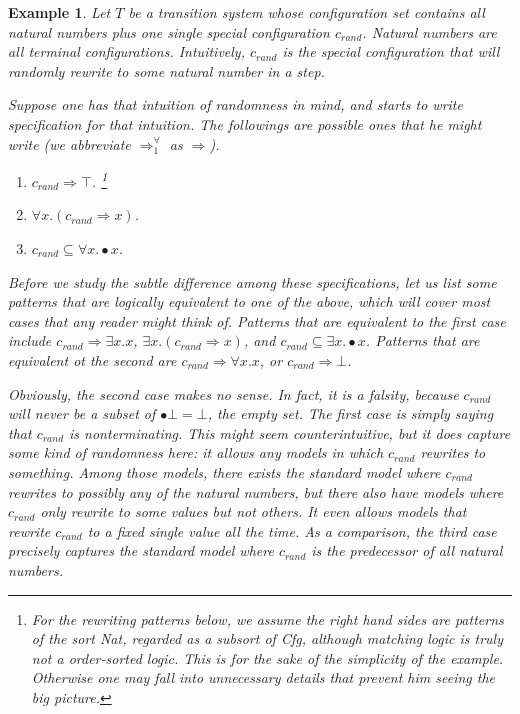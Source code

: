 \documentclass{article}
\theoremstyle{plain}
\newtheorem{eg}[thm]{Example}
\def\snext{\bullet}
\def\Cfg{\textit{Cfg}}
\begin{document}
\begin{eg}
	Let $T$ be a transition system whose configuration set contains all natural numbers plus one single special configuration $c_\textit{rand}$. Natural numbers are all terminal configurations. Intuitively, $c_\textit{rand}$ is the special configuration that will randomly rewrite to some natural number in a step.
	
	Suppose one has that intuition of randomness in mind, and starts to write specification for that intuition. The followings are possible ones that he might write (we abbreviate $\Rightarrow^{\forall}_1$ as $\Rightarrow$).
	\begin{enumerate}
		\item $c_\textit{rand} \Rightarrow \top$. \footnote{For the rewriting patterns below, we assume the right hand sides are patterns of the sort \textit{Nat}, regarded as a subsort of \Cfg, although matching logic is truly not a order-sorted logic. This is for the sake of the simplicity of the example. Otherwise one may fall into unnecessary details that prevent him seeing the big picture. } 
	    \item $\forall x . (c_\textit{rand} \Rightarrow x)$.
	    \item $c_\textit{rand} \subseteq \forall x . \snext x$.
	\end{enumerate}
Before we study the subtle difference among these specifications, let us list some patterns that are logically equivalent to one of the above, which will cover most cases that any reader might think of. Patterns that are equivalent to the first case include $c_\textit{rand} \Rightarrow \exists x . x$,
$\exists x . (c_\textit{rand} \Rightarrow x)$,
and $c_\textit{rand} \subseteq \exists x . \snext x$. Patterns that are equivalent ot the second are
$c_\textit{rand} \Rightarrow \forall x . x$, or
$c_\textit{rand} \Rightarrow \bot$.

Obviously, the second case makes no sense. In fact, it is a falsity, because $c_\textit{rand}$ will never be a subset of $\snext \bot = \bot$, the empty set. The first case is simply saying that $c_\textit{rand}$ is nonterminating. This might seem counterintuitive, but it does capture some kind of randomness here: it allows \emph{any models} in which $c_\textit{rand}$ rewrites to something. Among those models, there exists the standard model where $c_\textit{rand}$ rewrites to possibly any of the natural numbers, but there also have models where $c_\textit{rand}$ only rewrite to some values but not others. It even allows models that rewrite $c_\textit{rand}$ to a fixed single value all the time. As a comparison, the third case precisely captures the standard model where $c_\textit{rand}$ is the predecessor of \emph{all natural numbers}.


\end{eg}
\end{document}

